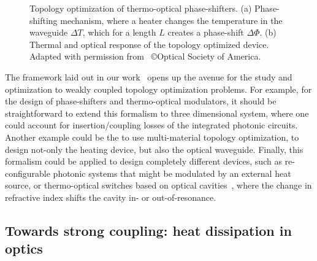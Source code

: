 \begin{figure}[tb]
    \centering
    \caption{Topology optimization of thermo-optical phase-shifters. (a) Phase-shifting mechanism, where a heater changes the temperature in the waveguide $\Delta T$, which for a length $L$ creates a phase-shift
    $\Delta \Phi$. (b) Thermal and optical response of the topology optimized device. Adapted with permission from~\cite{ownpub0} \copyright Optical Society of America.}
    \label{fig:thermo_res}
\end{figure}

The framework laid out in our work~\cite{ownpub0} opens up the avenue for the study and optimization to weakly coupled topology optimization problems. For example, for the design of phase-shifters and thermo-optical modulators, it should be straightforward to extend this
formalism to three dimensional system, where one could account for insertion/coupling losses of the integrated photonic circuits. Another example could be the to use multi-material topology optimization, to design not-only the heating
device, but also the optical waveguide. Finally, this formalism could be applied to design completely different devices, such as re-configurable photonic systems that might be modulated by an external heat source, or thermo-optical
switches based on optical cavities~\cite{switch, switch_2}, where the change in refractive index shifts the cavity in- or out-of-resonance.

\subsection*{Towards strong coupling: heat dissipation in optics}


